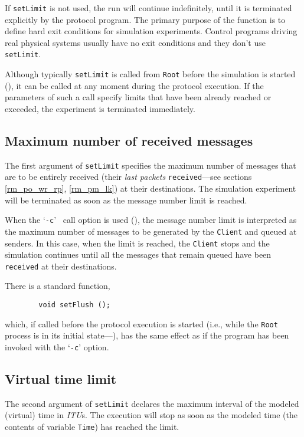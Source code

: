 If {\tt setLimit} is not used, the run will continue
indefinitely, until it is terminated explicitly by the protocol
program.
The primary purpose of the function is to define hard exit conditions for
simulation experiments.
Control programs driving real physical systems usually have no exit conditions
and they don't use {\tt setLimit}.

Although typically {\tt setLimit} is called from {\tt Root} before the
simulation is started (),
it can be called at any moment during the protocol execution.
If the parameters of such a call specify limits that have been already
reached or exceeded, the experiment is terminated immediately.

\subsection{Maximum number of received messages}
\label{rm_ts_mm}

The first argument of {\tt setLimit} specifies the maximum number of
messages that are to be entirely received (their {\em last packets\/}
{\tt received}---see sections \ref{rm_po_wr_rp}, \ref{rm_pm_lk}) at their
destinations.
The simulation experiment will be terminated as soon as the message number
limit is reached.

When the `{\tt -c}' \smurph\ call option is used (),
the message number limit is interpreted as the maximum number of messages
to be generated by the {\tt Client} and queued at senders.
In this case, when the limit is reached, the {\tt Client} stops and the
simulation continues until all the messages that remain queued have been
{\tt received} at their destinations.

There is a standard function,
\begin{verbatim}
        void setFlush ();
\end{verbatim}
which, if called before the protocol
execution is started (i.e., while the {\tt Root} process is in its initial
state---), has the same effect as
if the program has been invoked with the `{\tt -c}' option.

\subsection{Virtual time limit}
\label{rm_ts_st}

The second argument of {\tt setLimit} declares the maximum interval of
the modeled (virtual) time in {\em ITU\/}s.
The execution will stop as soon as the modeled time (the contents of
variable {\tt Time}) has reached the limit.

